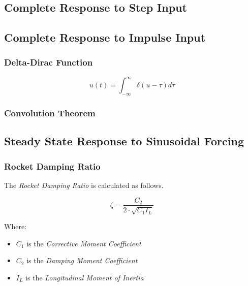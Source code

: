\documentclass[]{article}
\providecommand{\tightlist}{%
  \setlength{\itemsep}{0pt}\setlength{\parskip}{0pt}}
\begin{document}
\subsection{Complete Response to Step
Input}\label{complete-response-to-step-input}

\subsection{Complete Response to Impulse
Input}\label{complete-response-to-impulse-input}

\subsubsection{Delta-Dirac Function}\label{delta-dirac-function}

\begin{equation}
\label{eq_delta_dirac}
u(t) = \int_{-\infty}^{\infty} \delta ( u - \tau ) d \tau
\end{equation}

\subsubsection{Convolution Theorem}\label{convolution-theorem}

\subsection{Steady State Response to Sinusoidal
Forcing}\label{steady-state-response-to-sinusoidal-forcing}

\subsubsection{Rocket Damping Ratio}\label{rocket-damping-ratio}

The \emph{Rocket Damping Ratio} is calculated as follows.

\begin{equation}
\label{eq_rocket_damping_ratio}
\zeta = \dfrac{C_2}{2 \cdot \sqrt{C_1 I_L}}
\end{equation}

Where:

\begin{itemize}
\tightlist
\item
  \(C_1\) is the \emph{Corrective Moment Coefficient}
\item
  \(C_2\) is the \emph{Damping Moment Coefficient}
\item
  \(I_L\) is the \emph{Longitudinal Moment of Inertia}
\end{itemize}
\end{document}
